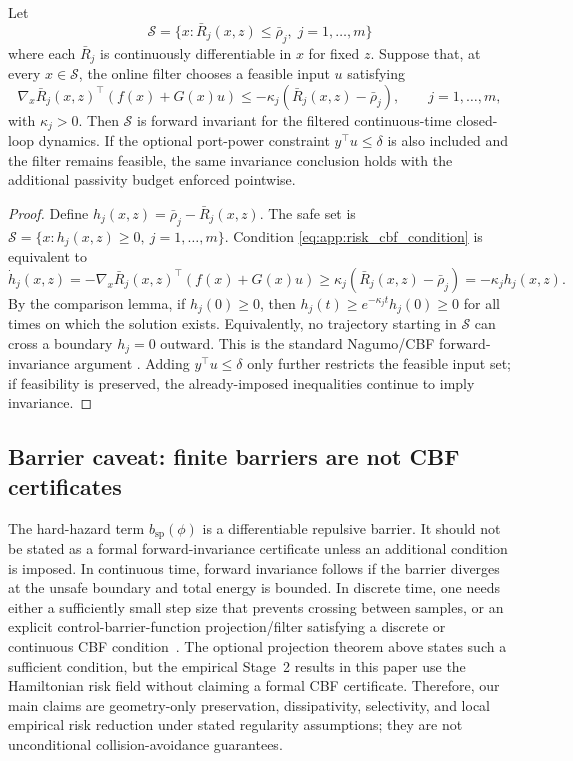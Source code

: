 \begin{theorem}
\label{thm:risk_filter_invariance}
Let
\[
    \mathcal S
    =
    \{x: \bar R_j(x,z)\le \bar\rho_j,\; j=1,\dots,m\}
\]
where each $\bar R_j$ is continuously differentiable in $x$ for fixed $z$. Suppose
that, at every $x\in\mathcal S$, the online filter chooses a feasible input $u$ satisfying
\begin{equation}
    \nabla_x\bar R_j(x,z)^\top(f(x)+G(x)u)
    \le
    -\kappa_j(\bar R_j(x,z)-\bar\rho_j),
    \qquad j=1,\dots,m,
    \label{eq:app:risk_cbf_condition}
\end{equation}
with $\kappa_j>0$. Then $\mathcal S$ is forward invariant for the filtered continuous-time
closed-loop dynamics. If the optional port-power constraint $y^\top u\le \delta$ is also
included and the filter remains feasible, the same invariance conclusion holds with the
additional passivity budget enforced pointwise.
\end{theorem}

\begin{proof}
Define $h_j(x,z)=\bar\rho_j-\bar R_j(x,z)$. The safe set is
$\mathcal S=\{x:h_j(x,z)\ge0,\ j=1,\dots,m\}$. Condition
\eqref{eq:app:risk_cbf_condition} is equivalent to
\[
    \dot h_j(x,z)
    =
    -\nabla_x\bar R_j(x,z)^\top(f(x)+G(x)u)
    \ge
    \kappa_j(\bar R_j(x,z)-\bar\rho_j)
    =
    -\kappa_j h_j(x,z).
\]
By the comparison lemma, if $h_j(0)\ge0$, then
$h_j(t)\ge e^{-\kappa_jt}h_j(0)\ge0$ for all times on which the solution exists.
Equivalently, no trajectory starting in $\mathcal S$ can cross a boundary
$h_j=0$ outward. This is the standard Nagumo/CBF forward-invariance argument
\citep{Nagumo1942,ames2016control}. Adding $y^\top u\le\delta$ only further restricts
the feasible input set; if feasibility is preserved, the already-imposed inequalities
continue to imply invariance.
\end{proof}

\subsection{Barrier caveat: finite barriers are not CBF certificates}
\label{app:safety_caveat}

The hard-hazard term \(b_{\mathrm{sp}}(\phi)\) is a differentiable repulsive barrier. It
should not be stated as a formal forward-invariance certificate unless an additional
condition is imposed. In continuous time, forward invariance follows if the barrier
diverges at the unsafe boundary and total energy is bounded. In discrete time, one
needs either a sufficiently small step size that prevents crossing between samples, or
an explicit control-barrier-function projection/filter satisfying a discrete or
continuous CBF condition~\citep{ames2016control}. The optional projection theorem above
states such a sufficient condition, but the empirical Stage~2 results in this paper use
the Hamiltonian risk field without claiming a formal CBF certificate. Therefore, our
main claims are geometry-only preservation, dissipativity, selectivity, and local empirical
risk reduction under stated regularity assumptions; they are not unconditional
collision-avoidance guarantees.

